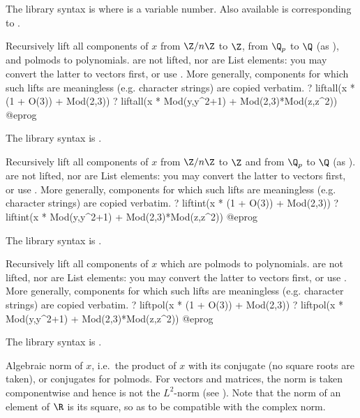 The library syntax is  where  is a variable number.
Also available is  corresponding to
.

\label{se:liftall}
Recursively lift all components of $x$ from $\Z/n\Z$ to $\Z$,
from $\Q_p$ to $\Q$ (as ), and polmods to
polynomials.  are not lifted, nor are List elements: you may
convert the latter to vectors first, or use . More
generally, components for which such lifts are meaningless (e.g. character
strings) are copied verbatim.
\bprog
? liftall(x * (1 + O(3)) + Mod(2,3))
? liftall(x * Mod(y,y^2+1) + Mod(2,3)*Mod(z,z^2))
@eprog

The library syntax is .

\label{se:liftint}
Recursively lift all components of $x$ from $\Z/n\Z$ to $\Z$ and
from $\Q_p$ to $\Q$ (as ).
 are not lifted, nor are List elements: you may
convert the latter to vectors first, or use . More
generally, components for which such lifts are meaningless (e.g. character
strings) are copied verbatim.
\bprog
? liftint(x * (1 + O(3)) + Mod(2,3))
? liftint(x * Mod(y,y^2+1) + Mod(2,3)*Mod(z,z^2))
@eprog

The library syntax is .

\label{se:liftpol}
Recursively lift all components of $x$ which are polmods to
polynomials.  are not lifted, nor are List elements: you may
convert the latter to vectors first, or use . More
generally, components for which such lifts are meaningless (e.g. character
strings) are copied verbatim.
\bprog
? liftpol(x * (1 + O(3)) + Mod(2,3))
? liftpol(x * Mod(y,y^2+1) + Mod(2,3)*Mod(z,z^2))
@eprog

The library syntax is .

\label{se:norm}
Algebraic norm of $x$, i.e.~the product of $x$ with
its conjugate (no square roots are taken), or conjugates for polmods. For
vectors and matrices, the norm is taken componentwise and hence is not the
$L^2$-norm (see ). Note that the norm of an element of
$\R$ is its square, so as to be compatible with the complex norm.

